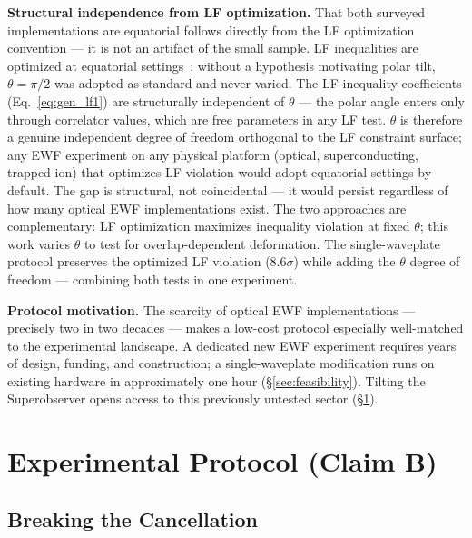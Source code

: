 \documentclass[twocolumn,aps,pra,superscriptaddress,floatfix,10pt]{revtex4-2}
\begin{document}
\textbf{Structural independence from LF optimization.} That both surveyed
implementations are equatorial follows directly from the LF optimization
convention --- it is not an artifact of the small sample. LF inequalities
are optimized at equatorial settings~\cite{Bong2020,Wiseman2023}; without a hypothesis
motivating polar tilt, $\theta = \pi/2$ was adopted as standard and never varied.
The LF inequality coefficients (Eq.~\ref{eq:gen_lf1}) are structurally independent of $\theta$
--- the polar angle enters only through correlator values, which are free
parameters in any LF test. $\theta$ is therefore a genuine independent degree of
freedom orthogonal to the LF constraint surface; any EWF experiment on
any physical platform (optical, superconducting, trapped-ion) that
optimizes LF violation would adopt equatorial settings by default. The
gap is structural, not coincidental --- it would persist regardless of how
many optical EWF implementations exist. The two approaches are
complementary: LF optimization maximizes inequality violation at fixed $\theta$;
this work varies $\theta$ to test for overlap-dependent deformation. The
single-waveplate protocol preserves the optimized LF violation ($8.6\sigma$)
while adding the $\theta$ degree of freedom --- combining both tests in one
experiment.

\textbf{Protocol motivation.} The scarcity of optical EWF implementations ---
precisely two in two decades --- makes a low-cost protocol especially
well-matched to the experimental landscape. A dedicated new EWF experiment
requires years of design, funding, and construction; a single-waveplate
modification runs on existing hardware in approximately one hour (\S\ref{sec:feasibility}).
Tilting the Superobserver opens access to this previously untested sector (\S\ref{sec:protocol}).

\section{Experimental Protocol (Claim B)}
\label{sec:protocol}

\subsection{Breaking the Cancellation}
\label{sec:breaking}
\end{document}
